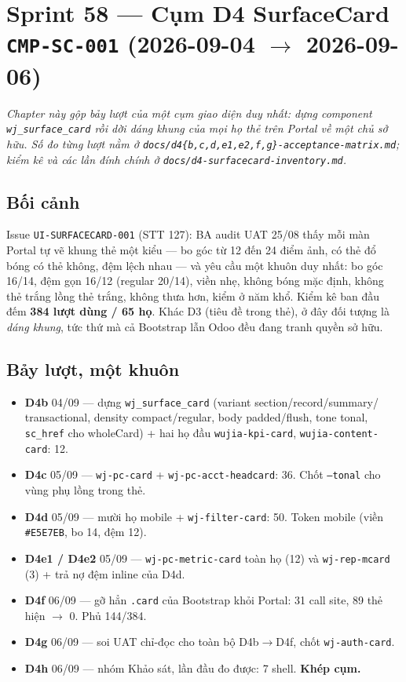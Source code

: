 \chapter{Sprint 58 --- Cụm D4 SurfaceCard \texttt{CMP-SC-001} (2026-09-04 $\to$ 2026-09-06)}

\emph{Chapter này gộp bảy lượt của một cụm giao diện duy nhất: dựng component
\texttt{wj\_surface\_card} rồi dời dáng khung của mọi họ thẻ trên Portal về một chủ sở hữu.
Số đo từng lượt nằm ở \texttt{docs/d4\{b,c,d,e1,e2,f,g\}-acceptance-matrix.md}; kiểm kê và
các lần đính chính ở \texttt{docs/d4-surfacecard-inventory.md}.}

\section{Bối cảnh}

Issue \texttt{UI-SURFACECARD-001} (STT 127): BA audit UAT 25/08 thấy mỗi màn Portal tự vẽ khung
thẻ một kiểu --- bo góc từ 12 đến 24 điểm ảnh, có thẻ đổ bóng có thẻ không, đệm lệch nhau ---
và yêu cầu một khuôn duy nhất: bo góc 16/14, đệm gọn 16/12 (regular 20/14), viền nhẹ, không bóng
mặc định, không thẻ trắng lồng thẻ trắng, không thưa hơn, kiểm ở năm khổ. Kiểm kê ban đầu đếm
\textbf{384 lượt dùng / 65 họ}. Khác D3 (tiêu đề trong thẻ), ở đây đối tượng là \emph{dáng khung},
tức thứ mà cả Bootstrap lẫn Odoo đều đang tranh quyền sở hữu.

\section{Bảy lượt, một khuôn}

\begin{itemize}
\item \textbf{D4b} 04/09 --- dựng \texttt{wj\_surface\_card} (variant section/record/summary/
  transactional, density compact/regular, body padded/flush, tone tonal, \texttt{sc\_href} cho
  wholeCard) + hai họ đầu \texttt{wujia-kpi-card}, \texttt{wujia-content-card}: 12.
\item \textbf{D4c} 05/09 --- \texttt{wj-pc-card} + \texttt{wj-pc-acct-headcard}: 36. Chốt
  \texttt{--tonal} cho vùng phụ lồng trong thẻ.
\item \textbf{D4d} 05/09 --- mười họ mobile + \texttt{wj-filter-card}: 50. Token mobile
  (viền \texttt{\#E5E7EB}, bo 14, đệm 12).
\item \textbf{D4e1 / D4e2} 05/09 --- \texttt{wj-pc-metric-card} toàn họ (12) và
  \texttt{wj-rep-mcard} (3) + trả nợ đệm inline của D4d.
\item \textbf{D4f} 06/09 --- gỡ hẳn \texttt{.card} của Bootstrap khỏi Portal: 31 call site,
  89 thẻ hiện $\to$ 0. Phủ 144/384.
\item \textbf{D4g} 06/09 --- soi UAT chỉ-đọc cho toàn bộ D4b$\to$D4f, chốt \texttt{wj-auth-card}.
\item \textbf{D4h} 06/09 --- nhóm Khảo sát, lần đầu đo được: 7 shell. \textbf{Khép cụm.}
\end{itemize}

